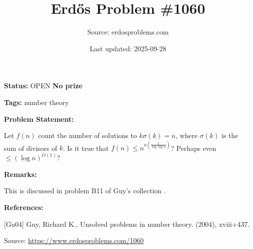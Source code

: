 \documentclass{article}
\title{Erd\H{o}s Problem \#1060}
\date{Last updated: 2025-09-28}
\author{Source: erdosproblems.com}
\begin{document}
\maketitle

\noindent\textbf{Status:} OPEN \quad \textbf{No prize}

\noindent\textbf{Tags:} number theory

\medskip
\noindent\textbf{Problem Statement:}

Let $f(n)$ count the number of solutions to $k\sigma(k)=n$, where $\sigma(k)$ is the sum of divisors of $k$. Is it true that $f(n)\leq n^{o(\frac{1}{\log\log n})}$? Perhaps even $\leq (\log n)^{O(1)}$?

\bigskip
\noindent\textbf{Remarks:}

This is discussed in problem B11 of Guy's collection \cite{Gu04}.

\bigskip
\noindent\textbf{References:}

[Gu04] Guy, Richard K., Unsolved problems in number theory. (2004), xviii+437.

\bigskip
\noindent\small{Source: \url{https://www.erdosproblems.com/1060}}
\end{document}
